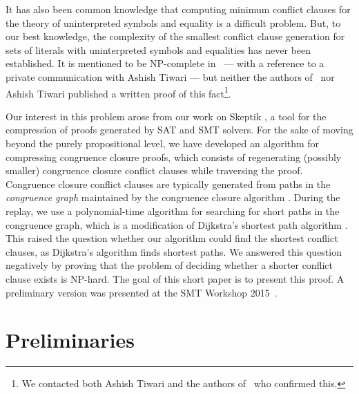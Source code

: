 \documentclass[smallextended]{svjour3}
\begin{document}
It has also been common knowledge that computing minimum conflict clauses for
the theory of uninterpreted symbols and equality is a difficult problem.  But,
to our best knowledge, the complexity of the smallest conflict clause generation
for sets of literals with uninterpreted symbols and equalities has never been
established.  It is mentioned to be NP-complete in~\cite{Nieuwenhuis6} --- with
a reference to a private communication with Ashish Tiwari --- but neither the
authors of~\cite{Nieuwenhuis6} nor Ashish Tiwari published a written proof of
this fact\footnote{We contacted both Ashish Tiwari and the authors
  of~\cite{Nieuwenhuis6} who confirmed this.}.

Our interest in this problem arose from our work on Skeptik \cite{Boudou1}, a tool for the compression of proofs generated by SAT and SMT solvers. For the sake of moving beyond the purely propositional level, we have developed an algorithm for compressing congruence closure proofs, which consists of regenerating (possibly smaller) congruence closure conflict clauses while traversing the proof. Congruence closure conflict clauses are typically generated from paths in the \emph{congruence graph} maintained by the congruence closure algorithm \cite{Fontaine2004,Nieuwenhuis6,Nieuwenhuis9}. During the replay, we use a polynomial-time algorithm for searching for short paths in the congruence graph, which is a modification of Dijkstra's shortest path algorithm \cite{Dijkstra1959}. This raised the question whether our algorithm could find the shortest conflict clauses, as Dijkstra's algorithm finds shortest paths. We answered this question negatively by proving that the problem of deciding whether a shorter conflict clause exists is NP-hard. The goal of this short paper is to present this proof.
A preliminary version was presented at the SMT Workshop 2015~\cite{Fellner1}.

\section{Preliminaries}
\end{document}
